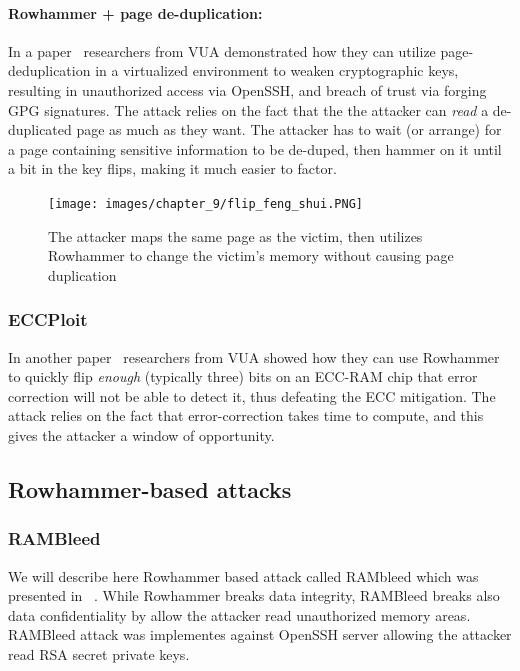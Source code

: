 \paragraph{Rowhammer + page de-duplication:}
In a paper~\cite{ffs} researchers from VUA demonstrated how they can utilize
page-deduplication in a virtualized environment to weaken cryptographic keys,
resulting in unauthorized access via OpenSSH, and breach of trust via forging
GPG signatures. The attack relies on the fact that the the attacker can
\emph{read} a de-duplicated page as much as they want. The attacker has to wait
(or arrange) for a page containing sensitive information to be de-duped, then
hammer on it until a bit in the key flips, making it much easier to factor.
\begin{figure}[!ht]
	\centering
	\texttt{[image: images/chapter\_9/flip\_feng\_shui.PNG]}
	\caption{The attacker maps the same page as the victim, then utilizes Rowhammer to change the victim's memory without causing page duplication}
	\label{fig:flip_feng_shui}
\end{figure}

\subsubsection{ECCPloit}\label{subsubsec:eccploit}
In another paper~\cite{eccploit} researchers from VUA showed how they can use
Rowhammer to quickly flip \emph{enough} (typically three) bits on an ECC-RAM
chip that error correction will not be able to detect it, thus defeating the ECC
mitigation. The attack relies on the fact that error-correction takes time to
compute, and this gives the attacker a window of opportunity.

\subsection{Rowhammer-based attacks}
\subsubsection{RAMBleed}
We will describe here Rowhammer based attack called RAMbleed which was presented in ~\cite{rambleed_paper}. While Rowhammer breaks data integrity, RAMBleed breaks also data confidentiality by allow the attacker read unauthorized memory areas. RAMBleed attack was implementes against OpenSSH server allowing the attacker read RSA secret private keys. 

